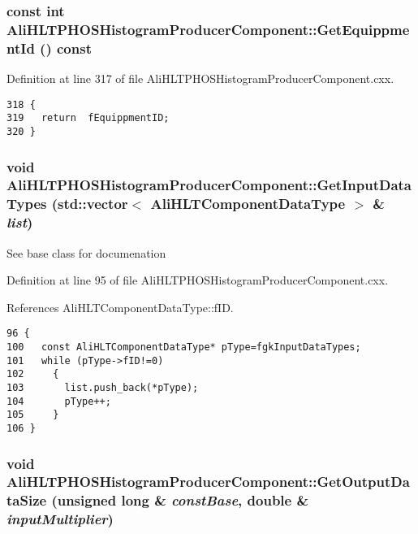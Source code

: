 \subsubsection{\setlength{\rightskip}{0pt plus 5cm}const int Ali\-HLTPHOSHistogram\-Producer\-Component::Get\-Equippment\-Id () const}\label{classAliHLTPHOSHistogramProducerComponent_a9}




Definition at line 317 of file Ali\-HLTPHOSHistogram\-Producer\-Component.cxx.

\footnotesize\begin{verbatim}318 {
319   return  fEquippmentID;
320 }
\end{verbatim}\normalsize 


\subsubsection{\setlength{\rightskip}{0pt plus 5cm}void Ali\-HLTPHOSHistogram\-Producer\-Component::Get\-Input\-Data\-Types (std::vector$<$ {\bf Ali\-HLTComponent\-Data\-Type} $>$ \& {\em list})\hspace{0.3cm}{\tt  [virtual]}}\label{classAliHLTPHOSHistogramProducerComponent_a11}


See base class for documenation 

Definition at line 95 of file Ali\-HLTPHOSHistogram\-Producer\-Component.cxx.

References Ali\-HLTComponent\-Data\-Type::f\-ID.

\footnotesize\begin{verbatim}96 {
100   const AliHLTComponentDataType* pType=fgkInputDataTypes;
101   while (pType->fID!=0) 
102     {
103       list.push_back(*pType);
104       pType++;
105     }
106 }
\end{verbatim}\normalsize 


\subsubsection{\setlength{\rightskip}{0pt plus 5cm}void Ali\-HLTPHOSHistogram\-Producer\-Component::Get\-Output\-Data\-Size (unsigned long \& {\em const\-Base}, double \& {\em input\-Multiplier})\hspace{0.3cm}{\tt  [virtual]}}\label{classAliHLTPHOSHistogramProducerComponent_a13}


